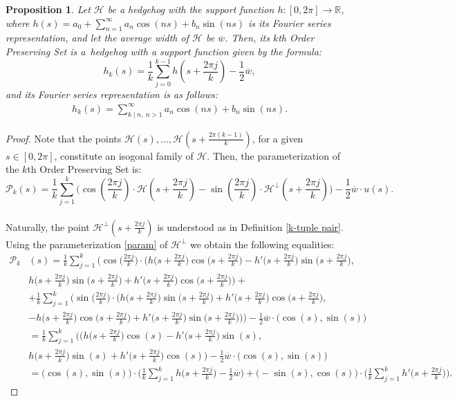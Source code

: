 \documentclass{amsart}
\newtheorem{prop}[thm]{Proposition}
\theoremstyle{definition}
\numberwithin{equation}{section}
\begin{document}
\begin{prop}\label{Preservingsuppth}
Let $\mathcal{H}$ be a hedgehog with the support function $h: [0,2\pi] \to \mathbb{R}$, where $h(s)=a_0+\sum_{n=1}^{\infty}a_n\cos (ns)+b_n\sin (ns)$ is its Fourier series representation, and let the average width of $\mathcal{H}$ be $\overline{w}$. Then, its $k$th Order Preserving Set is a~hedgehog with a support function given by the formula:
$$ h_k(s) = \frac{1}{k}\sum_{j=0}^{k-1}h\left(s+\frac{2\pi j}{k}\right) - \frac{1}{2}\overline{w},$$
and its Fourier series representation is as follows:
\begin{align}
    \label{eqFourierkOPS}h_k(s) = \sum_{k \mid n,\ n > 1}^\infty a_n\cos(ns) + b_n\sin(ns).
\end{align}
\end{prop}
\begin{proof}
 Note that the points $\mathcal{H}(s),\ldots,\mathcal{H}\left(s+\frac{2\pi(k-1)}{k}\right)$, for a given $s\in[0,2\pi]$, constitute an isogonal family of $\mathcal{H}$. Then, the parameterization of the $k$th Order Preserving Set is:
    $$\mathcal{P}_k(s) =\frac{1}{k}\sum_{j=1}^{k}\Bigg(\cos\left(\frac{2\pi j}{k}\right)\cdot \mathcal{H}\left(s+\frac{2\pi j}{k}\right)-\sin\left(\frac{2\pi j}{k}\right)\cdot \mathcal{H}^\perp\left(s+\frac{2\pi j}{k}\right)\Bigg) -\frac{1}{2}\overline{w}\cdot u(s).$$\\Naturally, the point $\mathcal{H}^\perp(s+\frac{2\pi j}{k})$ is understood as in Definition \ref{k-tuple pair}. Using the parameterization \eqref{param} of $\mathcal{H}^\perp$ we obtain the following equalities:
    {\footnotesize
    \begin{align*}    
    \mathcal{P}_k&(s) = \frac{1}{k}\sum_{j=1}^{k}\Bigg(\cos\Big(\frac{2\pi j}{k}\Big)\cdot \Bigg( h\Big(s+\frac{2\pi j}{k}\Big)\cos\Big(s+\frac{2\pi j}{k}\Big) - h'\Big(s+\frac{2\pi j}{k}\Big) \sin\Big(s+\frac{2\pi j}{k}\Big),\\&  h\Big(s+\frac{2\pi j}{k}\Big) \sin\Big(s+\frac{2\pi j}{k}\Big) + h'\Big(s+\frac{2\pi j}{k}\Big) \cos\Big(s+\frac{2\pi j}{k}\Big) \Bigg)+\\&+\frac{1}{k}\sum_{j=1}^{k}\Bigg(\sin\Big(\frac{2\pi j}{k}\Big)\cdot \Bigg( h\Big(s+\frac{2\pi j}{k}\Big) \sin\Big(s+\frac{2\pi j}{k}\Big) + h'\Big(s+\frac{2\pi j}{k}\Big) \cos\Big(s+\frac{2\pi j}{k}\Big),\\&   -h\Big(s+\frac{2\pi j}{k}\Big) \cos\Big(s+\frac{2\pi j}{k}\Big) + h'\Big(s+\frac{2\pi j}{k}\Big) \sin\Big(s+\frac{2\pi j}{k}\Big) \Bigg)\Bigg)-\frac{1}{2}\overline{w}\cdot \big(\cos(s),\sin(s)\big)\\&=\frac{1}{k}\sum_{j=1}^{k}\Bigg( \Bigg( h\Big(s+\frac{2\pi j}{k}\Big)\cos(s) - h'\Big(s+\frac{2\pi j}{k}\Big) \sin(s),\\&  h\Big(s+\frac{2\pi j}{k}\Big) \sin(s) + h'\Big(s+\frac{2\pi j}{k}\Big) \cos(s) \Bigg)-\frac{1}{2}\overline{w}\cdot \big(\cos(s),\sin(s)\big)\\&= \Big(\cos(s),\sin(s)\Big)\cdot \Bigg(\frac{1}{k}\sum_{j=1}^{k} h\Big(s+\frac{2\pi j}{k}\Big)-\frac{1}{2}\overline{w}\Bigg) + \Big(-\sin(s),\cos(s)\Big)\cdot \Bigg(\frac{1}{k}\sum_{j=1}^{k} h'\Big(s+\frac{2\pi j}{k}\Big)\Bigg).
    \end{align*}}



\end{proof}
\end{document}

